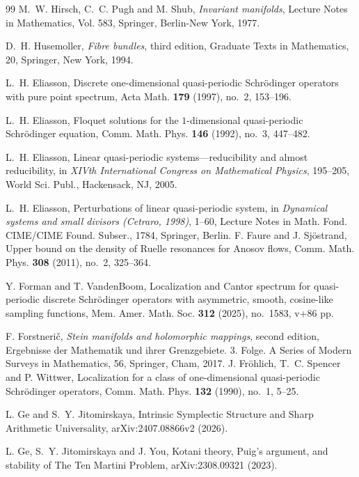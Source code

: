 \documentclass[reqno,11pt]{amsart}
\begin{document}
\begin{thebibliography}{99}
M.~W. Hirsch, C.~C. Pugh and M. Shub, {\it Invariant manifolds}, Lecture Notes in Mathematics, Vol. 583, Springer, Berlin-New York, 1977.

D.~H. Husemoller, {\it Fibre bundles}, third edition, 
Graduate Texts in Mathematics, 20, Springer, New York, 1994.


L.~H. Eliasson, Discrete one-dimensional quasi-periodic Schr\"odinger operators with pure point spectrum, Acta Math. {\bf 179} (1997), no.~2, 153--196.


L.~H. Eliasson, Floquet solutions for the $1$-dimensional quasi-periodic Schr\"odinger equation, Comm. Math. Phys. {\bf 146} (1992), no.~3, 447--482.

L.~H. Eliasson, Linear quasi-periodic systems---reducibility and almost reducibility, in {\it XIVth International Congress on Mathematical Physics}, 195--205, World Sci. Publ., Hackensack, NJ, 2005.

L.~H. Eliasson, Perturbations of linear quasi-periodic system, in {\it Dynamical systems and small divisors (Cetraro, 1998)}, 1--60, Lecture Notes in Math. Fond. CIME/CIME Found. Subser., 1784, Springer, Berlin.
F. Faure and J. Sj\"ostrand, Upper bound on the density of Ruelle resonances for Anosov flows, Comm. Math. Phys. {\bf 308} (2011), no.~2, 325--364.

Y. Forman and T. VandenBoom, Localization and Cantor spectrum for quasi-periodic discrete Schr\"odinger operators with asymmetric, smooth, cosine-like sampling functions, Mem. Amer. Math. Soc. {\bf 312} (2025), no.~1583, v+86 pp.

F. Forstneri\v c, {\it Stein manifolds and holomorphic mappings}, second edition, 
Ergebnisse der Mathematik und ihrer Grenzgebiete. 3. Folge. A Series of Modern Surveys in Mathematics, 56, Springer, Cham, 2017.
	J. Fr\"ohlich, T.~C. Spencer and P. Wittwer, Localization for a class of one-dimensional quasi-periodic Schr\"odinger operators, Comm. Math. Phys. {\bf 132} (1990), no.~1, 5--25.
	


L. Ge and S.~Y. Jitomirskaya, Intrinsic Symplectic Structure and Sharp Arithmetic Universality,  arXiv:2407.08866v2 (2026).


L. Ge, S.~Y. Jitomirskaya and J. You, Kotani theory, Puig's argument, and stability of The Ten Martini Problem,   arXiv:2308.09321 (2023).


\end{thebibliography}
\end{document}
